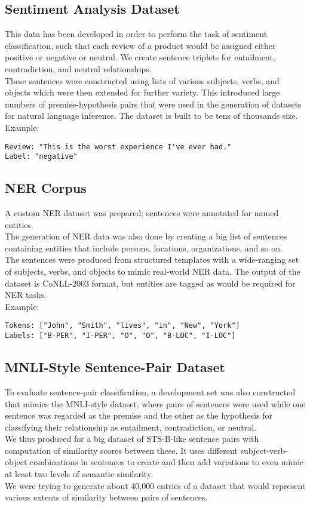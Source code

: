 ﻿\documentclass{article}
\begin{document}
\subsection{Sentiment Analysis Dataset}
This data has been developed in order to perform the task of sentiment classification, such that each review of a product would be assigned either positive or negative or neutral.
We create sentence triplets for entailment, contradiction, and neutral relationships.\\
These sentences were constructed using lists of various subjects, verbs, and objects which were then extended for further variety.
This introduced large numbers of premise-hypothesis pairs that were used in the generation of datasets for natural language inference.
The dataset is built to be tens of thousands size.\\
Example:

\begin{verbatim}
Review: "This is the worst experience I've ever had."
Label: "negative"
\end{verbatim}

\subsection{NER Corpus}
A custom NER dataset was prepared; sentences were annotated for named entities.\\
The generation of NER data was also done by creating a big list of sentences containing entities that include persons, locations, organizations, and so on.\\
The sentences were produced from structured templates with a wide-ranging set of subjects, verbs, and objects to mimic real-world NER data.
The output of the dataset is CoNLL-2003 format, but entities are tagged as would be required for NER tasks.\\
Example:
\begin{verbatim}
Tokens: ["John", "Smith", "lives", "in", "New", "York"]
Labels: ["B-PER", "I-PER", "O", "O", "B-LOC", "I-LOC"]
\end{verbatim}

\subsection{MNLI-Style Sentence-Pair Dataset}
To evaluate sentence-pair classification, a development set was also constructed that mimics the MNLI-style dataset, where pairs of sentences were used while one sentence was regarded as the premise and the other as the hypothesis for classifying their relationship as entailment, contradiction, or neutral.\\
We thus produced for a big dataset of STS-B-like sentence pairs with computation of similarity scores between these.
It uses different subject-verb-object combinations in sentences to create and then add variations to even mimic at least two levels of semantic similarity.\\
We were trying to generate about 40,000 entries of a dataset that would represent various extents of similarity between pairs of sentences.
\end{document}
